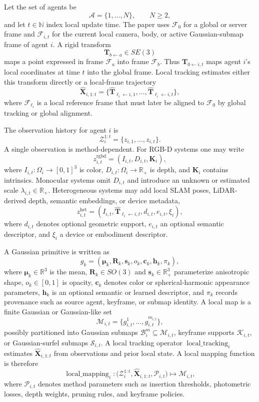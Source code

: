 \documentclass[11pt, a4paper, logo]{googledeepmind}
\begin{document}
Let the set of agents be
\[
\mathcal{A}=\{1,\ldots,N\}, \qquad N\geq2,
\]
and let $t\in\mathbb{N}$ index local update time. The paper uses $\mathcal{F}_0$ for a global or server frame and $\mathcal{F}_{i,t}$ for the current local camera, body, or active Gaussian-submap frame of agent $i$. A rigid transform
\[
\mathbf{T}_{b\leftarrow a}\in SE(3)
\]
maps a point expressed in frame $\mathcal{F}_a$ into frame $\mathcal{F}_b$. Thus $\mathbf{T}_{0\leftarrow i,t}$ maps agent $i$'s local coordinates at time $t$ into the global frame. Local tracking estimates either this transform directly or a local-frame trajectory
\[
\hat{\mathbf{X}}_{i,1:t}
=\{\hat{\mathbf{T}}_{\ell_i\leftarrow i,1},\ldots,
\hat{\mathbf{T}}_{\ell_i\leftarrow i,t}\},
\]
where $\mathcal{F}_{\ell_i}$ is a local reference frame that must later be aligned to $\mathcal{F}_0$ by global tracking or global alignment.

The observation history for agent $i$ is
\[
\mathcal{Z}_i^{1:t}=\{z_{i,1},\ldots,z_{i,t}\}.
\]
A single observation is method-dependent. For RGB-D systems one may write
\[
z_{i,t}^{\mathrm{rgbd}}=(I_{i,t},D_{i,t},\mathbf{K}_i),
\]
where $I_{i,t}:\Omega_i\rightarrow[0,1]^3$ is color, $D_{i,t}:\Omega_i\rightarrow\mathbb{R}_{+}$ is depth, and $\mathbf{K}_i$ contains intrinsics. Monocular systems omit $D_{i,t}$ and introduce an unknown or estimated scale $\lambda_{i,t}\in\mathbb{R}_{+}$. Heterogeneous systems may add local SLAM poses, LiDAR-derived depth, semantic embeddings, or device metadata,
\[
z_{i,t}^{\mathrm{het}}=(I_{i,t},\hat{\mathbf{T}}_{\ell_i\leftarrow i,t},d_{i,t},e_{i,t},\xi_i),
\]
where $d_{i,t}$ denotes optional geometric support, $e_{i,t}$ an optional semantic descriptor, and $\xi_i$ a device or embodiment descriptor.

A Gaussian primitive is written as
\[
g_k=(\boldsymbol{\mu}_k,\mathbf{R}_k,\mathbf{s}_k,o_k,\mathbf{c}_k,\mathbf{h}_k,\pi_k),
\]
where $\boldsymbol{\mu}_k\in\mathbb{R}^3$ is the mean, $\mathbf{R}_k\in SO(3)$ and $\mathbf{s}_k\in\mathbb{R}_{+}^{3}$ parameterize anisotropic shape, $o_k\in[0,1]$ is opacity, $\mathbf{c}_k$ denotes color or spherical-harmonic appearance parameters, $\mathbf{h}_k$ is an optional semantic or learned descriptor, and $\pi_k$ records provenance such as source agent, keyframe, or submap identity. A local map is a finite Gaussian or Gaussian-like set
\[
\mathcal{M}_{i,t}=\{g_{i,t}^{1},\ldots,g_{i,t}^{m_{i,t}}\},
\]
possibly partitioned into Gaussian submaps $\mathcal{B}_{i}^{m}\subseteq\mathcal{M}_{i,t}$, keyframe supports $\mathcal{K}_{i,t}$, or Gaussian-surfel submaps $\mathcal{S}_{i,t}$. A local tracking operator $\operatorname{local\_tracking}_i$ estimates $\hat{\mathbf{X}}_{i,1:t}$ from observations and prior local state. A local mapping function is therefore
\[
\operatorname{local\_mapping}_i:\bigl(\mathcal{Z}_i^{1:t},\hat{\mathbf{X}}_{i,1:t},\mathcal{P}_{i,t}\bigr)
\mapsto \mathcal{M}_{i,t},
\]
where $\mathcal{P}_{i,t}$ denotes method parameters such as insertion thresholds, photometric losses, depth weights, pruning rules, and keyframe policies.
\end{document}

